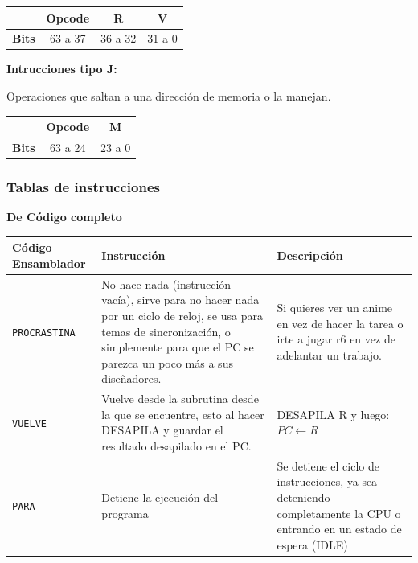 \documentclass{article}
\begin{document}
\begin{table}[H]
  \centering
  \begin{tabular}{|c|c|c|c|}
    \hline
                  & \textbf{Opcode} & \textbf{R} & \textbf{V} \\ \hline
    \textbf{Bits} & 63 a 37         & 36 a 32    & 31 a 0     \\
    \hline
  \end{tabular}
\end{table}

\textbf{Intrucciones tipo J:}

Operaciones que saltan a una dirección de memoria o la manejan.

\begin{table}[H]
  \centering
  \begin{tabular}{|c|c|c|}
    \hline
                  & \textbf{Opcode} & \textbf{M} \\ \hline
    \textbf{Bits} & 63 a 24         & 23 a 0     \\
    \hline
  \end{tabular}
\end{table}

\subsubsection{Tablas de instrucciones}

\textbf{De Código completo}

\begin{longtable}{|p{}|p{}|p{}|}
  \hline
  \textbf{Código Ensamblador}       & \textbf{Instrucción}              & \textbf{Descripción} \\
  \hline
  \texttt{PROCRASTINA}              &
  No hace nada (instrucción vacía), sirve para no hacer nada por un ciclo de reloj,
  se usa para temas de sincronización, o simplemente para que el PC se parezca un poco más
  a sus diseñadores.                &
  Si quieres ver un anime en vez de hacer la tarea o irte a jugar r6 en vez de adelantar
  un trabajo.                                                                                  \\
  \hline
  \texttt{VUELVE}                   &
  Vuelve desde la subrutina desde la que se encuentre, esto al hacer DESAPILA y guardar
  el resultado desapilado en el PC. &
  DESAPILA R y luego: $PC \leftarrow R$                                                        \\
  \hline
  \texttt{PARA}                     & Detiene la ejecución del programa &
  Se detiene el ciclo de instrucciones, ya sea deteniendo completamente la CPU o
  entrando en un estado de espera (IDLE)                                                       \\
  \hline
\end{longtable}
\end{document}
